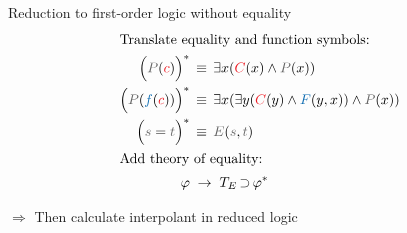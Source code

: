 \documentclass[final,hyperref={pdfpagelabels=true}]{beamer}
\newcommand{\colOne}[1]{{\color{TuInfRed}#1}}
\newcommand{\colTwo}[1]{{\color{TuWienBlue}#1}}
\newcommand{\colA}[1]{\colOne{#1}}
\newcommand{\colB}[1]{\colTwo{#1}}
\newcommand{\gray}[1]{{\color{InfosysDarkGrey}#1}}
\newcommand{\itemizeOnBlockStart}{
		\vspace*{-0.5em}
	}
\DeclareMathOperator{\limpl}{\supset}
\begin{document}
\begin{frame}
\begin{columns}[t]
\begin{column}{\mycolwidth}
			\begin{block}{Reduction to first-order logic without equality \cite{Craig57linear}} 
				\vspace*{-1em}
				\newcommand{\transformsep}{\;\to\;}
				\begin{align*}
					\intertext{Translate equality and function symbols:}
					\Big(\gray P(\colA c)\Big)^*  & \, \equiv \, \exists x (\colA C(x) \land \gray P(x)) \\
					\Big( \gray P(\colB f( \colA c)) \Big)^* & \, \equiv \, \exists x (  \exists y( \colA C(y) \land \colB F(y, x)) \land \gray P(x)) \\
					\Big( \gray s = \gray t \Big)^* & \, \equiv \, \gray E(\gray s, \gray t) \\
					\intertext{Add theory of equality:} 
					\varphi & \transformsep T_E \limpl \varphi^*
				\end{align*}


				$\Rightarrow$ Then calculate interpolant in reduced logic


\end{block}
\end{column}
\end{columns}
\end{frame}
\end{document}
